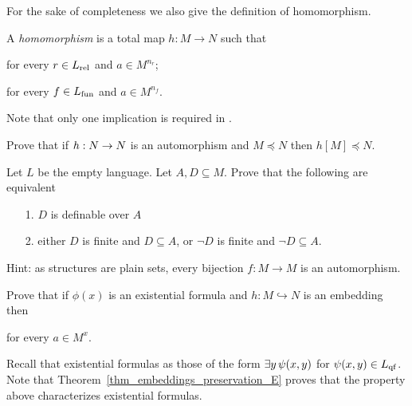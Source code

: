 
For the sake of completeness we also give the definition of homomorphism.

\begin{definition}\label{def_homomorphism}
A \emph{homomorphism} is a total map $h:M\to N$ such that

\qquad for every $r\in L_{\rm rel}$ and $a\in M^{n_r}$;\smallskip\par

\qquad  for every $f\in L_{\rm fun}$ and $a\in M^{n_f}$.

Note that only one implication is required in .
\end{definition}

\begin{exercise}
Prove that if $h:N\rightarrow N$ is an automorphism and $M\preceq N$ then $h[M]\preceq N$.
\end{exercise}

\begin{exercise}
Let $L$ be the empty language.
Let $A,D\subseteq M$.
Prove that the following are equivalent
\begin{itemize}
 \item[1.] $D$ is definable over $A$
 \item[2.] either $D$ is finite and $D\subseteq A$, or $\neg D$ is finite and $\neg D\subseteq A$.
\end{itemize}
Hint: as structures are plain sets, every bijection $f:M\to M$ is an automorphism.
\end{exercise}

\begin{exercise}\label{dlorlkurb}
Prove that if $\phi(x)$ is an existential formula and $h:M\hookrightarrow N$ is an embedding then

\hfill for every $a\in M^x$.

Recall that existential formulas as those of the form $\exists y\,\psi(x,y)$ for $\psi(x,y)\in L_{\rm qf}$.
Note that Theorem~\ref{thm_embeddings_preservation_E} proves that the property above characterizes existential formulas.

\end{exercise}


